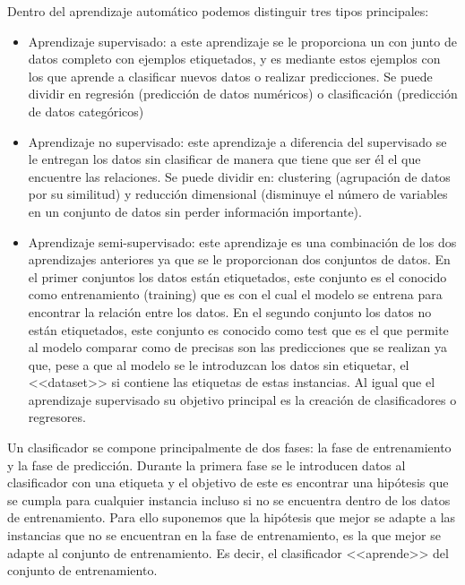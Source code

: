 Dentro del aprendizaje automático podemos distinguir tres tipos principales:
\begin{itemize}
\item Aprendizaje supervisado: a este aprendizaje se le proporciona un con junto de datos completo con ejemplos etiquetados, y es mediante estos ejemplos con los que aprende a clasificar nuevos datos o realizar predicciones. Se puede dividir en regresión (predicción de datos numéricos) o clasificación (predicción de datos categóricos)
\item Aprendizaje no supervisado: este aprendizaje a diferencia del supervisado se le entregan los datos sin clasificar de manera que tiene que ser él el que encuentre las relaciones. Se puede dividir en: clustering (agrupación de datos por su similitud) y reducción dimensional (disminuye el número de variables en un conjunto de datos sin perder información importante).
\item Aprendizaje semi-supervisado: este aprendizaje es una combinación de los dos aprendizajes anteriores ya que se le proporcionan dos conjuntos de  datos. En el primer conjuntos los datos están etiquetados, este conjunto es el conocido como entrenamiento (training) que es con el cual el modelo se entrena para encontrar la relación entre los datos. En el segundo conjunto los datos no están etiquetados, este conjunto es conocido como test que es el que permite al modelo comparar como de precisas son las predicciones que se realizan ya que, pese a que al modelo se le introduzcan los datos sin etiquetar, el <<dataset>> si contiene las etiquetas de estas instancias. Al igual que el aprendizaje supervisado su objetivo principal es la creación de clasificadores o regresores.
\end{itemize}

Un clasificador se compone principalmente de dos fases: la fase de entrenamiento y la fase de predicción. Durante la primera fase se le introducen datos al clasificador con una etiqueta y el objetivo de este es encontrar una hipótesis que se cumpla para cualquier instancia incluso si no se encuentra dentro de los datos de entrenamiento. Para ello suponemos que la  hipótesis que mejor se adapte a las instancias que no se encuentran en la fase de entrenamiento, es la que mejor se adapte al conjunto de entrenamiento. Es decir, el clasificador <<aprende>> del conjunto de entrenamiento. 







